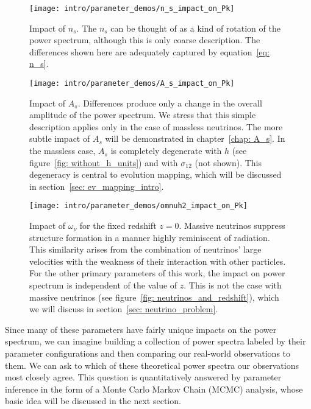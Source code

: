 
\begin{figure}[ht!]
  \centering
  \texttt{[image: intro/parameter\_demos/n\_s\_impact\_on\_Pk]}
  \caption[Impact of $n_s$ on $P(k)$]{Impact of $n_s$. The $n_s$ can be
  thought of as a kind of rotation of the power spectrum, although this
  is only coarse description. The differences shown here are
  adequately captured by equation~\ref{eq: n_s}.}
  \label{fig: n_s_dependence}
\end{figure}

\begin{figure}[ht!]
  \centering
  \texttt{[image: intro/parameter\_demos/A\_s\_impact\_on\_Pk]}
  \caption[Impact of $A_s$ on $P(k)$]{Impact of $A_s$. Differences produce
  	only a change in the overall amplitude of the power spectrum. We stress
  	that this simple description applies only in the case of massless
  	neutrinos. The more subtle impact of $A_s$ will be demonstrated in
  	chapter~\ref{chap: A_s}. In the massless case, $A_s$ is completely
  	degenerate with $h$ (see figure~\ref{fig: without_h_units}) and with
  	$\sigma_{12}$ (not shown). This degeneracy is central to evolution
  	mapping, which will be discussed in section~\ref{sec: ev_mapping_intro}.}
  \label{fig: A_s_dependence}
\end{figure}

\begin{figure}[ht!]
  \centering
  \texttt{[image: intro/parameter\_demos/omnuh2\_impact\_on\_Pk]}
  \caption[Impact of $\omega_\nu$ on $P(k)$]{Impact of $\omega_\nu$ for the
  	fixed redshift $z=0$. Massive neutrinos suppress structure formation in
  	a manner highly reminiscent of radiation. This similarity arises from the
  	combination of neutrinos' large velocities with the weakness of their 
  	interaction with other particles.
  	For the other primary parameters of this work,
  	the impact on power spectrum is independent of the value of $z$. This is
  	not the case with massive neutrinos
  	(see figure~\ref{fig: neutrinos_and_redshift}), which we will discuss in
  	section~\ref{sec: neutrino_problem}.}
  \label{fig: omega_nu_dependence}
\end{figure}


Since many of these parameters have fairly unique impacts on the power 
spectrum, we can imagine building a collection of power spectra labeled by
their parameter configurations and then comparing our real-world observations 
to them. We can ask to which of these theoretical power spectra our 
observations most closely agree. This question is quantitatively answered by 
parameter inference in the form of a Monte Carlo Markov Chain (MCMC) analysis, whose basic idea will be discussed in the next section.

